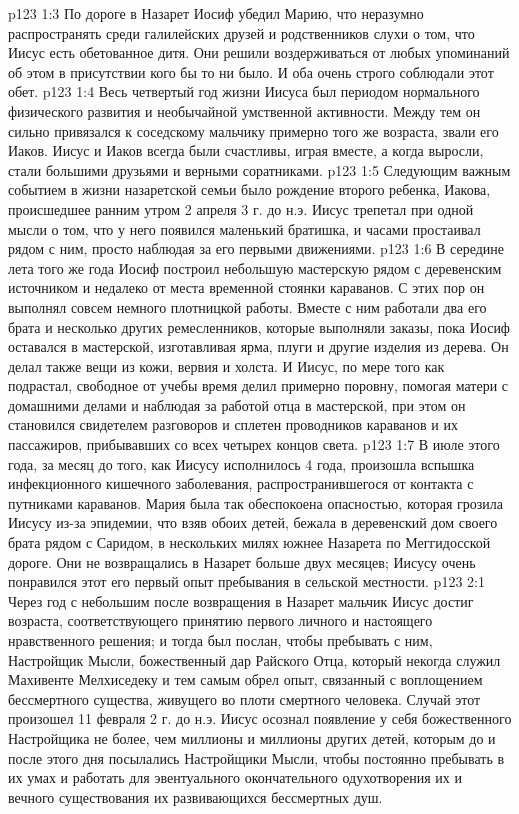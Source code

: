 \vs p123 1:3 По дороге в Назарет Иосиф убедил Марию, что неразумно распространять среди галилейских друзей и родственников слухи о том, что Иисус есть обетованное дитя. Они решили воздерживаться от любых упоминаний об этом в присутствии кого бы то ни было. И оба очень строго соблюдали этот обет.
\vs p123 1:4 Весь четвертый год жизни Иисуса был периодом нормального физического развития и необычайной умственной активности. Между тем он сильно привязался к соседскому мальчику примерно того же возраста, звали его Иаков. Иисус и Иаков всегда были счастливы, играя вместе, а когда выросли, стали большими друзьями и верными соратниками.
\vs p123 1:5 Следующим важным событием в жизни назаретской семьи было рождение второго ребенка, Иакова, происшедшее ранним утром 2 апреля 3 г. до н.э. Иисус трепетал при одной мысли о том, что у него появился маленький братишка, и часами простаивал рядом с ним, просто наблюдая за его первыми движениями.
\vs p123 1:6 В середине лета того же года Иосиф построил небольшую мастерскую рядом с деревенским источником и недалеко от места временной стоянки караванов. С этих пор он выполнял совсем немного плотницкой работы. Вместе с ним работали два его брата и несколько других ремесленников, которые выполняли заказы, пока Иосиф оставался в мастерской, изготавливая ярма, плуги и другие изделия из дерева. Он делал также вещи из кожи, вервия и холста. И Иисус, по мере того как подрастал, свободное от учебы время делил примерно поровну, помогая матери с домашними делами и наблюдая за работой отца в мастерской, при этом он становился свидетелем разговоров и сплетен проводников караванов и их пассажиров, прибывавших со всех четырех концов света.
\vs p123 1:7 В июле этого года, за месяц до того, как Иисусу исполнилось 4 года, произошла вспышка инфекционного кишечного заболевания, распространившегося от контакта с путниками караванов. Мария была так обеспокоена опасностью, которая грозила Иисусу из\hyp{}за эпидемии, что взяв обоих детей, бежала в деревенский дом своего брата рядом с Саридом, в нескольких милях южнее Назарета по Меггидосской дороге. Они не возвращались в Назарет больше двух месяцев; Иисусу очень понравился этот его первый опыт пребывания в сельской местности.
\vs p123 2:1 Через год с небольшим после возвращения в Назарет мальчик Иисус достиг возраста, соответствующего принятию первого личного и настоящего нравственного решения; и тогда был послан, чтобы пребывать с ним, Настройщик Мысли, божественный дар Райского Отца, который некогда служил Махивенте Мелхиседеку и тем самым обрел опыт, связанный с воплощением бессмертного существа, живущего во плоти смертного человека. Случай этот произошел 11 февраля 2 г. до н.э. Иисус осознал появление у себя божественного Настройщика не более, чем миллионы и миллионы других детей, которым до и после этого дня посылались Настройщики Мысли, чтобы постоянно пребывать в их умах и работать для эвентуального окончательного одухотворения их и вечного существования их развивающихся бессмертных душ.
